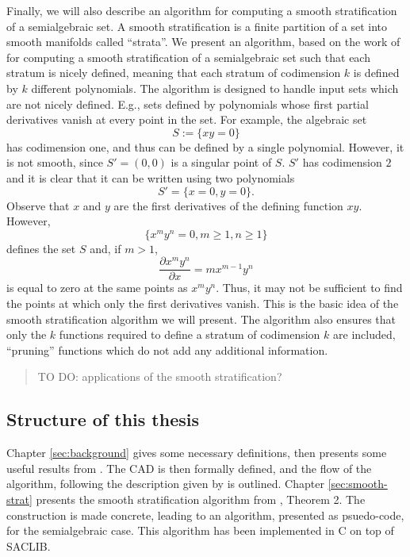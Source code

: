 \documentclass[
]{book}
\theoremstyle{definition}
\theoremstyle{definition}
\theoremstyle{definition}
\theoremstyle{definition}
\theoremstyle{remark}
\begin{document}
Finally, we will also describe an algorithm for computing a smooth stratification of a semialgebraic set. A smooth stratification is a finite partition of a set into smooth manifolds called ``strata''. We present an algorithm, based on the work of \citet{gv1995} for computing a smooth stratification of a semialgebraic set such that each stratum is nicely defined, meaning that each stratum of codimension \(k\) is defined by \(k\) different polynomials.
The algorithm is designed to handle input sets which are not nicely defined. E.g., sets defined by polynomials whose first partial derivatives vanish at every point in the set.
For example, the algebraic set
\[
S := \{ x y = 0 \}
\]
has codimension one, and thus can be defined by a single polynomial. However, it is not smooth, since \(S' = (0,0)\) is a singular point of \(S\). \(S'\) has codimension \(2\) and it is clear that it can be written using two polynomials
\[
S' = \{ x = 0, y = 0 \}.
\]
Observe that \(x\) and \(y\) are the first derivatives of the defining function \(xy\). However,
\[
\{ x^m y^n = 0, m \ge 1, n \ge 1 \}
\]
defines the set \(S\) and, if \(m > 1\),
\[
\dfrac{\partial x^m y^n}{\partial x} = m x^{m-1} y^n
\]
is equal to zero at the same points as \(x^my^n\). Thus, it may not be sufficient to find the points at which only the first derivatives vanish. This is the basic idea of the smooth stratification algorithm we will present.
The algorithm also ensures that only the \(k\) functions required to define a stratum of codimension \(k\) are included, ``pruning'' functions which do not add any additional information.

\begin{quote}
TO DO: applications of the smooth stratification?
\end{quote}

\hypertarget{structure-of-this-thesis}{%
\subsection{Structure of this thesis}\label{structure-of-this-thesis}}

Chapter \ref{sec:background} gives some necessary definitions, then presents some useful results from \citet{bgv15}. The CAD
is then formally defined, and the flow of the algorithm, following the description given by \citet{coste2000} is outlined.
Chapter \ref{sec:smooth-strat} presents the smooth stratification algorithm from \citet{gv1995}, Theorem 2.
The construction is made concrete, leading to an algorithm, presented as psuedo-code, for the semialgebraic case. This algorithm has been implemented in C on top of SACLIB.
\end{document}
